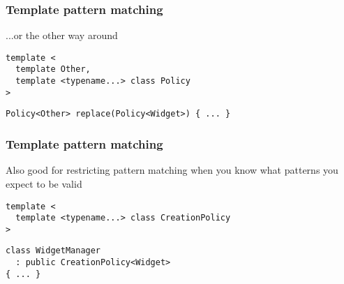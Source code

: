 \documentclass[14pt,a4paper,dvipsnames,usenames]{beamer}
\begin{document}
\begin{frame}[fragile]
  \frametitle{Template pattern matching}

  ...or the other way around

  \vspace{.5cm}
  \begin{lstlisting}
template <
  template Other,
  template <typename...> class Policy
>
  \end{lstlisting}
  \vspace*{-.4cm}
  \begin{lstlisting}[morekeywords={Policy, Other}]
Policy<Other> replace(Policy<Widget>) { ... }
  \end{lstlisting}
  
\end{frame}

\begin{frame}[fragile]
  \frametitle{Template pattern matching}

  Also good for restricting pattern matching when you know what patterns you expect to be valid

  \vspace{.5cm}
  \begin{lstlisting}
template <
  template <typename...> class CreationPolicy
>
  \end{lstlisting}
  \vspace*{-.4cm}
  \begin{lstlisting}[morekeywords={CreationPolicy}]
class WidgetManager 
  : public CreationPolicy<Widget> 
{ ... }
  \end{lstlisting}
  
\end{frame}
\end{document}
